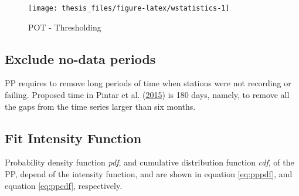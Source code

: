 \documentclass[12pt,oneside]{reedthesis}
\begin{document}
\footnotesize
\begin{figure}

{\centering \texttt{[image: thesis\_files/figure-latex/wstatistics-1]} 

}

\caption{POT - Thresholding}\label{fig:wstatistics}
\end{figure}
\normalsize

\hypertarget{exclude-no-data-periods}{%
\subsection{Exclude no-data periods}\label{exclude-no-data-periods}}

PP requires to remove long periods of time when stations were not recording or failing. Proposed time in Pintar et al. (\protect\hyperlink{ref-Pintar2015}{2015}) is 180 days, namely, to remove all the gaps from the time series larger than six months.

\hypertarget{fit-intensity-function}{%
\subsection{Fit Intensity Function}\label{fit-intensity-function}}

Probability density function \emph{pdf}, and cumulative distribution function \emph{cdf}, of the PP, depend of the intensity function, and are shown in equation \eqref{eq:pppdf}, and equation \eqref{eq:ppcdf}, respectively.
\end{document}
